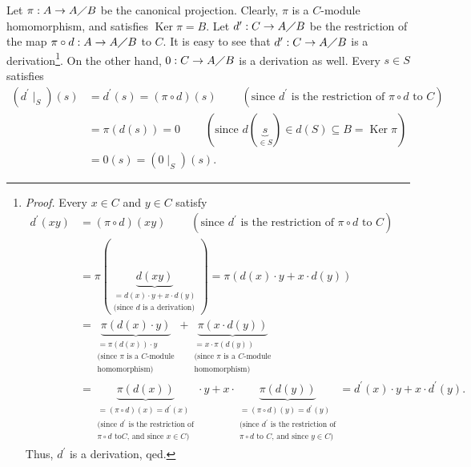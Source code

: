 \documentclass[etingof-lie.tex]{subfiles}
\begin{document}
Let $\pi:A\rightarrow A\diagup B$ be the canonical projection. Clearly, $\pi$
is a $C$-module homomorphism, and satisfies $\operatorname*{Ker}\pi=B$. Let
$d^{\prime}:C\rightarrow A\diagup B$ be the restriction of the map $\pi\circ
d:A\rightarrow A\diagup B$ to $C$. It is easy to see that $d^{\prime
}:C\rightarrow A\diagup B$ is a derivation\footnote{\textit{Proof.} Every
$x\in C$ and $y\in C$ satisfy%
\begin{align*}
d^{\prime}\left(  xy\right)   &  =\left(  \pi\circ d\right)  \left(
xy\right)  \ \ \ \ \ \ \ \ \ \ \left(  \text{since }d^{\prime}\text{ is the
restriction of }\pi\circ d\text{ to }C\right) \\
&  =\pi\left(  \underbrace{d\left(  xy\right)  }_{\substack{=d\left(
x\right)  \cdot y+x\cdot d\left(  y\right)  \\\text{(since }d\text{ is a
derivation)}}}\right)  =\pi\left(  d\left(  x\right)  \cdot y+x\cdot d\left(
y\right)  \right) \\
&  =\underbrace{\pi\left(  d\left(  x\right)  \cdot y\right)  }%
_{\substack{=\pi\left(  d\left(  x\right)  \right)  \cdot y\\\text{(since }%
\pi\text{ is a }C\text{-module}\\\text{homomorphism)}}}+\underbrace{\pi\left(
x\cdot d\left(  y\right)  \right)  }_{\substack{=x\cdot\pi\left(  d\left(
y\right)  \right)  \\\text{(since }\pi\text{ is a }C\text{-module}%
\\\text{homomorphism)}}}\\
&  =\underbrace{\pi\left(  d\left(  x\right)  \right)  }_{\substack{=\left(
\pi\circ d\right)  \left(  x\right)  =d^{\prime}\left(  x\right)
\\\text{(since }d^{\prime}\text{ is the restriction of}\\\pi\circ d\text{ to
}C\text{, and since }x\in C\text{)}}}\cdot y+x\cdot\underbrace{\pi\left(
d\left(  y\right)  \right)  }_{\substack{=\left(  \pi\circ d\right)  \left(
y\right)  =d^{\prime}\left(  y\right)  \\\text{(since }d^{\prime}\text{ is the
restriction of}\\\pi\circ d\text{ to }C\text{, and since }y\in C\text{)}%
}}=d^{\prime}\left(  x\right)  \cdot y+x\cdot d^{\prime}\left(  y\right)  .
\end{align*}
Thus, $d^{\prime}$ is a derivation, qed.}. On the other hand, $0:C\rightarrow
A\diagup B$ is a derivation as well. Every $s\in S$ satisfies%
\begin{align*}
\left(  d^{\prime}\mid_{S}\right)  \left(  s\right)   &  =d^{\prime}\left(
s\right)  =\left(  \pi\circ d\right)  \left(  s\right)
\ \ \ \ \ \ \ \ \ \ \left(  \text{since }d^{\prime}\text{ is the restriction
of }\pi\circ d\text{ to }C\right) \\
&  =\pi\left(  d\left(  s\right)  \right)  =0\ \ \ \ \ \ \ \ \ \ \left(
\text{since }d\left(  \underbrace{s}_{\in S}\right)  \in d\left(  S\right)
\subseteq B=\operatorname*{Ker}\pi\right) \\
&  =0\left(  s\right)  =\left(  0\mid_{S}\right)  \left(  s\right)  .
\end{align*}
\end{document}
